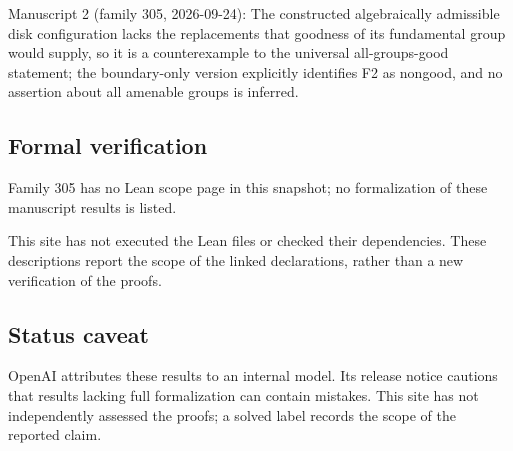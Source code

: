 \documentclass[11pt]{article}
\begin{document}
Manuscript 2 (family 305, 2026-09-24): The constructed algebraically admissible disk configuration lacks the replacements that goodness of its fundamental group would supply, so it is a counterexample to the universal all-groups-good statement; the boundary-only version explicitly identifies F2 as nongood, and no assertion about all amenable groups is inferred.

\subsection{Formal verification}
Family 305 has no Lean scope page in this snapshot; no formalization of these manuscript results is listed.

This site has not executed the Lean files or checked their dependencies. These descriptions report the scope of the linked declarations, rather than a new verification of the proofs.

\subsection{Status caveat}
OpenAI attributes these results to an internal model. Its release notice cautions that results lacking full formalization can contain mistakes. This site has not independently assessed the proofs; a solved label records the scope of the reported claim.
\end{document}
